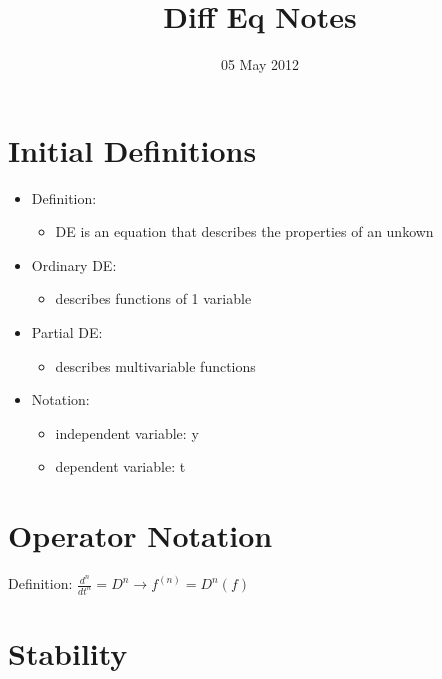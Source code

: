 \documentclass[11pt]{article}
\title{Diff Eq Notes}
\author{}
\date{05 May 2012}
\begin{document}
\maketitle

\setcounter{tocdepth}{3}
\tableofcontents
\vspace*{1cm}


\section{Initial Definitions}
\label{sec-1}

\begin{itemize}
\item Definition:

\begin{itemize}
\item DE is an equation that describes the properties of an unkown
\end{itemize}

\item Ordinary DE:

\begin{itemize}
\item describes functions of 1 variable
\end{itemize}

\item Partial DE:

\begin{itemize}
\item describes multivariable functions
\end{itemize}

\item Notation:

\begin{itemize}
\item independent variable: y
\item dependent variable: t
\end{itemize}

\end{itemize}
\section{Operator Notation}
\label{sec-2}

  Definition:
  $\frac{d^n}{dt^n} = D^n \rightarrow f^{(n)} = D^n(f)$
\section{Stability}
\label{sec-3}
\end{document}
